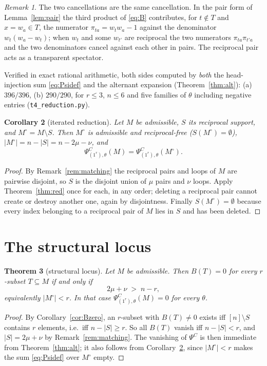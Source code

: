 \documentclass[11pt]{article}
\newtheorem{theorem}{Theorem}
\newtheorem{corollary}[theorem]{Corollary}
\theoremstyle{definition}
\theoremstyle{remark}
\newtheorem{remark}[theorem]{Remark}
\newcommand{\PsiC}{\Psi^{C}}
\begin{document}
\begin{remark}
The two cancellations are the same cancellation. In the pair form of
Lemma~\ref{lem:pair} the third product of \eqref{eq:B} contributes, for
$t\notin T$ and $x=w_a\in T$, the numerator $\pi_{ta}=w_tw_a-1$ against the
denominator $w_t(w_a-w_t)$; when $w_t$ and some $w_{t'}$ are reciprocal the two
numerators $\pi_{ta}\pi_{t'a}$ and the two denominators cancel against each other
in pairs. The reciprocal pair acts as a transparent spectator.
\end{remark}

Verified in exact rational arithmetic, both sides computed by \emph{both} the
head-injection sum \eqref{eq:Psidef} and the alternant expansion
(Theorem~\ref{thm:alt}): (a) $396/396$, (b) $290/290$, for $r\le3$, $n\le6$ and
five families of $\theta$ including negative entries (\texttt{t4\_reduction.py}).

\begin{corollary}[iterated reduction]\label{cor:iter}
Let $M$ be admissible, $S$ its reciprocal support, and $M^{\circ}=M\setminus S$.
Then $M^\circ$ is admissible and \emph{reciprocal-free}
($S(M^\circ)=\emptyset$), $|M^\circ|=n-|S|=n-2\mu-\nu$, and
\[
  \PsiC_{(1^r),\theta}(M)=\PsiC_{(1^r),\theta}(M^{\circ}).
\]
\end{corollary}

\begin{proof}
By Remark~\ref{rem:matching} the reciprocal pairs and loops of $M$ are pairwise
disjoint, so $S$ is the disjoint union of $\mu$ pairs and $\nu$ loops. Apply
Theorem~\ref{thm:red} once for each, in any order; deleting a reciprocal pair
cannot create or destroy another one, again by disjointness. Finally
$S(M^\circ)=\emptyset$ because every index belonging to a reciprocal pair of $M$
lies in $S$ and has been deleted.
\end{proof}

\section{The structural locus}

\begin{theorem}[structural locus]\label{thm:struct}
Let $M$ be admissible. Then $B(T)=0$ for \emph{every} $r$-subset $T\subseteq M$ if
and only if
\[
  2\mu+\nu\;>\;n-r,
\]
equivalently $|M^\circ|<r$. In that case $\PsiC_{(1^r),\theta}(M)=0$ for every
$\theta$.
\end{theorem}

\begin{proof}
By Corollary~\ref{cor:Bzero}, an $r$-subset with $B(T)\ne0$ exists iff
$[n]\setminus S$ contains $r$ elements, i.e.\ iff $n-|S|\ge r$. So all $B(T)$
vanish iff $n-|S|<r$, and $|S|=2\mu+\nu$ by Remark~\ref{rem:matching}.
The vanishing of $\PsiC$ is then immediate from Theorem~\ref{thm:alt}; it also
follows from Corollary~\ref{cor:iter}, since $|M^\circ|<r$ makes the sum
\eqref{eq:Psidef} over $M^\circ$ empty.
\end{proof}
\end{document}
